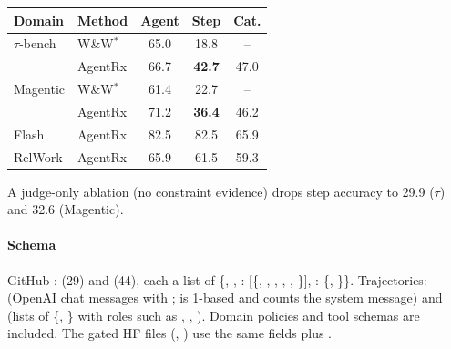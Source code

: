 \begin{center}\small
\begin{tabular}{@{}llccc@{}}\toprule
Domain & Method & Agent & Step & Cat.\\\midrule
$\tau$-bench & W\&W$^*$ & 65.0 & 18.8 & --\\
 & AgentRx & 66.7 & \textbf{42.7} & 47.0\\
Magentic & W\&W$^*$ & 61.4 & 22.7 & --\\
 & AgentRx & 71.2 & \textbf{36.4} & 46.2\\
Flash & AgentRx & 82.5 & 82.5 & 65.9\\
RelWork & AgentRx & 65.9 & 61.5 & 59.3\\\bottomrule
\end{tabular}
\end{center}
A judge-only ablation (no constraint evidence) drops step accuracy to 29.9 ($\tau$) and 32.6 (Magentic).

\paragraph{Schema} GitHub :  (29) and  (44), each a list of \{, , : [\{, , , , , \}], : \{, \}\}. Trajectories:  (OpenAI chat messages with ;  is 1-based and counts the system message) and  (lists of \{, \} with roles such as , , ). Domain policies and tool schemas are included. The gated HF files (, ) use the same fields plus .

